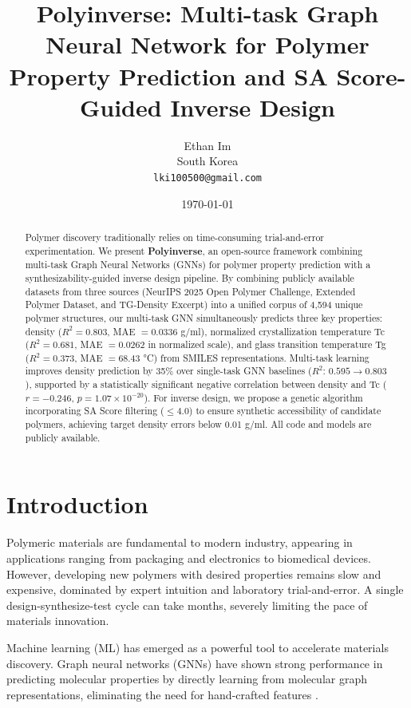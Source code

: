 \documentclass{article}
\title{\textbf{Polyinverse}: Multi-task Graph Neural Network for Polymer Property Prediction 
and SA Score-Guided Inverse Design}
\author{
  Ethan Im \\
  South Korea \\
  \texttt{lki100500@gmail.com}
}
\date{\today}
\begin{document}
\maketitle

\begin{abstract}
Polymer discovery traditionally relies on time-consuming trial-and-error experimentation.
We present \textbf{Polyinverse}, an open-source framework combining multi-task Graph Neural
Networks (GNNs) for polymer property prediction with a synthesizability-guided inverse design
pipeline. By combining publicly available datasets from three sources (NeurIPS 2025 Open Polymer
Challenge, Extended Polymer Dataset, and TG-Density Excerpt) into a unified corpus of 4,594
unique polymer structures, our multi-task GNN simultaneously predicts three key properties:
density ($R^2 = 0.803$, MAE $= 0.0336$ g/ml), normalized crystallization temperature Tc
($R^2 = 0.681$, MAE $= 0.0262$ in normalized scale), and glass transition temperature Tg
($R^2 = 0.373$, MAE $= 68.43$ °C) from SMILES representations.
Multi-task learning improves density prediction by 35\% over single-task GNN baselines
($R^2$: $0.595 \rightarrow 0.803$), supported by a statistically significant negative
correlation between density and Tc ($r = -0.246$, $p = 1.07 \times 10^{-20}$).
For inverse design, we propose a genetic algorithm incorporating SA Score filtering
($\leq 4.0$) to ensure synthetic accessibility of candidate polymers, achieving target
density errors below 0.01 g/ml. All code and models are publicly available.
\end{abstract}

\section{Introduction}

Polymeric materials are fundamental to modern industry, appearing in applications
ranging from packaging and electronics to biomedical devices. However, developing
new polymers with desired properties remains slow and expensive, dominated by
expert intuition and laboratory trial-and-error. A single design-synthesize-test
cycle can take months, severely limiting the pace of materials innovation.

Machine learning (ML) has emerged as a powerful tool to accelerate materials discovery.
Graph neural networks (GNNs) have shown strong performance in predicting molecular
properties by directly learning from molecular graph representations,
eliminating the need for hand-crafted features \citep{gcnn_polymer_2018}.
\end{document}
